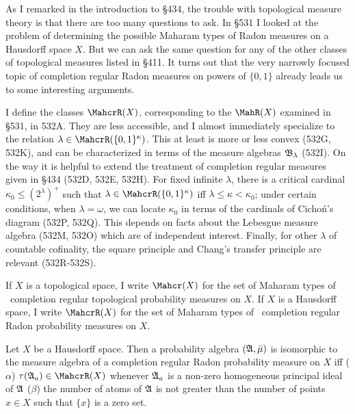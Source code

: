 
\def\chaptername{Topologies and measures III}
\def\sectionname{Completion regular measures on $\{0,1\}^I$}


\def\headlinesectionname{Completion regular measures on
$\{0,1{\delimiter"5267309}^I$}

As I remarked in the introduction to \S434, the trouble with topological
measure theory is that there are too many questions to ask.   In \S531 I
looked at the problem of determining the possible Maharam types of Radon
measures on a Hausdorff space $X$.   But we can ask the same
question for any of the other classes of topological measures listed in
\S411.   It turns out that the very narrowly focused topic of completion
regular Radon measures on powers of $\{0,1\}$ already leads us to some
interesting arguments.

I define the classes $\MahcrR(X)$, corresponding to the $\MahR(X)$
examined in \S531, in 532A.   They are less accessible, and I almost
immediately specialize to the relation
$\lambda\in\MahcrR(\{0,1\}^{\kappa})$.   This at least is more or less
convex (532G, 532K), and can be characterized in terms of the measure
algebras $\frak B_{\lambda}$ (532I).   On the way it is helpful to extend
the treatment of completion regular measures given in \S434 (532D, 532E,
532H).   For fixed infinite $\lambda$, there is a critical cardinal
$\kappa_0\le(2^{\lambda})^+$ such that
$\lambda\in\MahcrR(\{0,1\}^{\kappa})$ iff $\lambda\le\kappa<\kappa_0$;
under certain conditions, when $\lambda=\omega$,
we can locate $\kappa_0$ in terms of the
cardinals of Cicho\'n's diagram (532P, 532Q).   This depends on facts
about the Lebesgue measure algebra (532M, 532O) which are of independent
interest.    Finally, for other $\lambda$ of countable cofinality, the
square principle and Chang's transfer principle are relevant (532R-532S).

 If $X$ is a topological space, I
write $\Mahcr(X)$ for the set of Maharam types of \Mth\ completion
regular topological probability measures on $X$.
If $X$ is a Hausdorff space, I write
$\MahcrR(X)$ for the set of Maharam types of \Mth\ completion regular
Radon probability measures on $X$.

 Let $X$ be a Hausdorff space.   Then a
probability algebra $(\frak A,\bar\mu)$ is isomorphic to the measure
algebra of a completion regular Radon probability measure on $X$ iff
($\alpha$) $\tau(\frak A_a)\in\MahcrR(X)$ whenever $\frak A_a$ is a
non-zero homogeneous principal ideal of $\frak A$ ($\beta$) the number
of atoms of $\frak A$ is not greater than the number of points $x\in X$
such that $\{x\}$ is a zero set.

